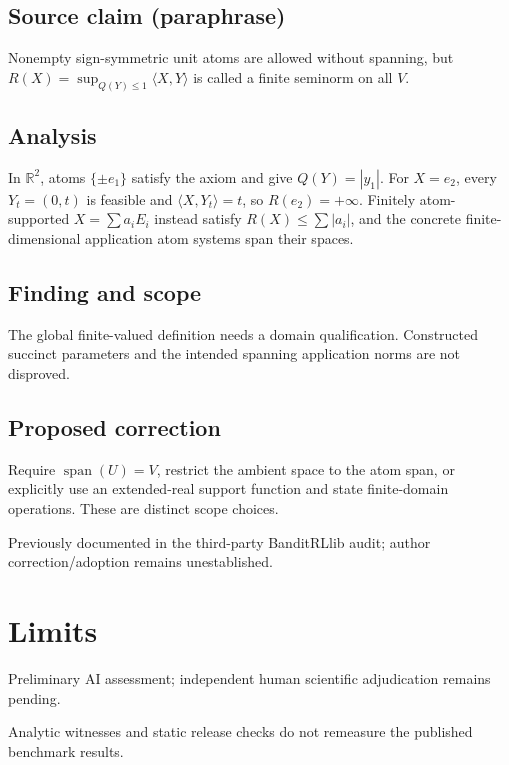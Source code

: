 \documentclass[11pt]{article}
\begin{document}
\subsection*{Source claim (paraphrase)}

Nonempty sign-symmetric unit atoms are allowed without spanning, but \(R(X)=\sup_{Q(Y)\le1}\langle X,Y\rangle\) is called a finite seminorm on all \(V\).

\subsection*{Analysis}

In \(\mathbb R^2\), atoms \(\{\pm e_1\}\) satisfy the axiom and give \(Q(Y)=|y_1|\). For \(X=e_2\), every \(Y_t=(0,t)\) is feasible and \(\langle X,Y_t\rangle=t\), so \(R(e_2)=+\infty\). Finitely atom-supported \(X=\sum a_iE_i\) instead satisfy \(R(X)\le\sum|a_i|\), and the concrete finite-dimensional application atom systems span their spaces.

\subsection*{Finding and scope}

The global finite-valued definition needs a domain qualification. Constructed succinct parameters and the intended spanning application norms are not disproved.

\subsection*{Proposed correction}

Require \(\operatorname{span}(U)=V\), restrict the ambient space to the atom span, or explicitly use an extended-real support function and state finite-domain operations. These are distinct scope choices.

Previously documented in the third-party BanditRLlib audit; author correction/adoption remains unestablished.

\section*{Limits}

Preliminary AI assessment; independent human scientific adjudication remains pending.\par

Analytic witnesses and static release checks do not remeasure the published benchmark results.\par
\end{document}
